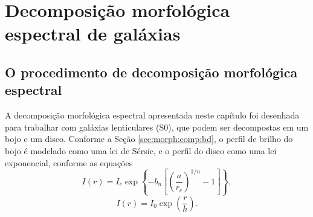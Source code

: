 


\chapter{Decomposição morfológica espectral de galáxias}
\label{sec:Decomp}


\section{O procedimento de decomposição morfológica espectral}

A decomposição morfológica espectral apresentada neste capítulo foi desenhada
para trabalhar com galáxias lenticulares (S0), que podem ser decompostas em um
bojo e um disco. Conforme a Seção \ref{sec:morph:comp:bd}, o perfil de brilho do
bojo é modelado como uma lei de Sérsic, e o perfil do disco como uma lei
exponencial, conforme as equações
\begin{equation*}
I(r) = I_e \exp \left\{- b_n \left[ \left( \frac{a}{r_e} \right)^{1/n}
- 1 \right] \right\},
\end{equation*}
\begin{equation*}
I(r) = I_0 \exp\left(\frac{r}{h}\right).
\end{equation*}

